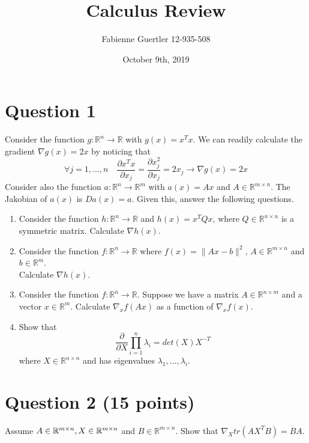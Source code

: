 \documentclass[
	10pt, %
]{../fphw}
\title{Calculus Review} %
\author{Fabienne Guertler 12-935-508} %
\date{October 9th, 2019} %
\institute{University of Bern} %
\begin{document}
	\maketitle
	\section*{Question 1 }
	\begin{problem}
		Consider the function $g:\mathbb{R}^n \rightarrow \mathbb{R}$ with $g(x) = x^Tx$. We can readily calculate the gradient $\nabla g(x) = 2x$ by noticing that
		\begin{equation*}
			\forall j=1,...,n
			\quad
			\frac{\partial x^Tx}{\partial x_j} = \frac{\partial x_j^2}{\partial x_j} = 2x_j \rightarrow \nabla g(x) = 2x
		\end{equation*} 
		Consider also the function $a:\mathbb{R}^n \rightarrow \mathbb{R}^m$ with $a(x) = Ax$ and $A \in \mathbb{R}^{m \times n}$. The Jakobian of $a(x)$ is $Da(x) = a$. Given this, answer the following questions.
		\medskip
		\begin{enumerate}
			\item Consider the function $h:\mathbb{R}^n \rightarrow \mathbb{R}$ and $h(x) = x^TQx\text{, where } Q\in\mathbb{R}^{n\times n}$ is a symmetric matrix. Calculate $\nabla h(x)$.
			\item Consider the function $f:\mathbb{R}^n \rightarrow \mathbb{R}$ where $f(x) = \|Ax-b\|^2 \text{, } A\in\mathbb{R}^{m\times n}$ and $b\in\mathbb{R}^m$.\\ Calculate $\nabla h(x)$.
			\item Consider the function $f:\mathbb{R}^n \rightarrow \mathbb{R}$. Suppose we have a matrix $A\in\mathbb{R}^{n\times m}$ and a vector $x\in\mathbb{R}^m$. Calculate $\nabla_x f(Ax)$ as a function of $\nabla_x f(x)$. 
			\item Show that
			\begin{equation*}
				\frac{\partial}{\partial X}\prod_{i=1}^{n}\lambda_i = det(X)X^{-T}
			\end{equation*}
			where $X\in\mathbb{R}^{n\times n}$ and has eigenvalues $\lambda_1,...,\lambda_i$.
		\end{enumerate}
	\end{problem}

	\section*{Question 2 (15 points)}
	\begin{problem}
		Assume $A\in\mathbb{R}^{m\times n},\space X\in\mathbb{R}^{m\times n}$ and $B\in\mathbb{R}^{m\times n}$. Show that $\nabla_X tr(AX^TB) = BA$.
	\end{problem}
	
\end{document}
